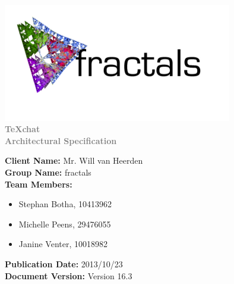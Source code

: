 \documentclass[11pt,a4paper]{moderncv}
\begin{document}
		\fontsize{36pt}{36pt}\selectfont
		\begin{center}
		\includegraphics[width=10cm]{./logo2.jpg}
			\textbf{\textcolor{gray}{\\TeXchat}}
			\textbf{\textcolor{gray}{\\Architectural Specification}}
		\vspace*{\fill}
		\end{center}
		
		\fontsize{12pt}{12pt}\selectfont
		\textbf{Client Name:} Mr. Will van Heerden\\
		\textbf{Group Name:} fractals\\
		\textbf{Team Members:}
			\begin{itemize}
				\item Stephan Botha, 10413962
				\item Michelle Peens, 29476055
				\item Janine Venter, 10018982	
			\end{itemize}
		\textbf{Publication Date:} 2013/10/23\\
		\textbf{Document Version:} Version 16.3
		
\end{document}
